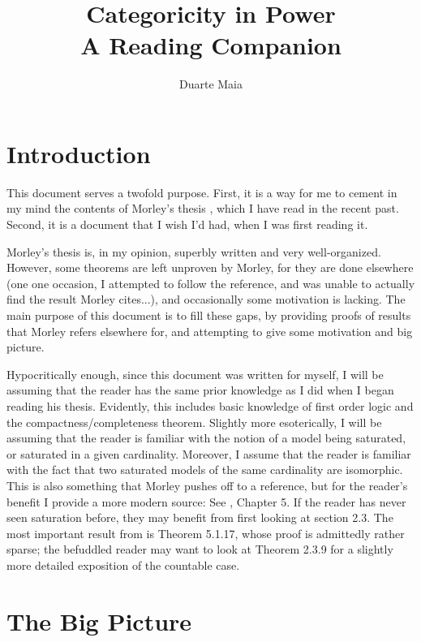 \documentclass{article}
\title{Categoricity in Power\\\large A Reading Companion}
\author{Duarte Maia}
\theoremstyle{nonumberplain}
\begin{document}
\maketitle

\tableofcontents

\section{Introduction}

This document serves a twofold purpose. First, it is a way for me to cement in my mind the contents of Morley's thesis \cite{morley}, which I have read in the recent past. Second, it is a document that I wish I'd had, when I was first reading it.

Morley's thesis is, in my opinion, superbly written and very well-organized. However, some theorems are left unproven by Morley, for they are done elsewhere (one one occasion, I attempted to follow the reference, and was unable to actually find the result Morley cites...), and occasionally some motivation is lacking. The main purpose of this document is to fill these gaps, by providing proofs of results that Morley refers elsewhere for, and attempting to give some motivation and big picture.

Hypocritically enough, since this document was written for myself, I will be assuming that the reader has the same prior knowledge as I did when I began reading his thesis. Evidently, this includes basic knowledge of first order logic and the compactness/completeness theorem. Slightly more esoterically, I will be assuming that the reader is familiar with the notion of a model being saturated, or saturated in a given cardinality. Moreover, I assume that the reader is familiar with the fact that two saturated models of the same cardinality are isomorphic. This is also something that Morley pushes off to a reference, but for the reader's benefit I provide a more modern source: See \cite{cnk}, Chapter 5. If the reader has never seen saturation before, they may benefit from first looking at section 2.3. The most important result from \cite{cnk} is Theorem 5.1.17, whose proof is admittedly rather sparse; the befuddled reader may want to look at Theorem 2.3.9 for a slightly more detailed exposition of the countable case.

\section{The Big Picture}
\end{document}
